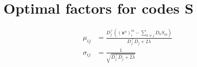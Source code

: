 \appendix
\label{app:factorParamsS}

\chapter{Optimal factors for codes $\mathbf{S}$ }

\begin{align}
\mu_{ij} &= \frac{ D_j^\intercal \left( \left(\mathbf{x}^n\right)_i^m - \sum_{k \neq j} D_k S_{ik} \right) }{ D_j^\intercal D_j + 2 \lambda } \\
\sigma_{ij} &= \frac{1}{\sqrt{ D_j^\intercal D_j + 2 \lambda }}
\end{align}